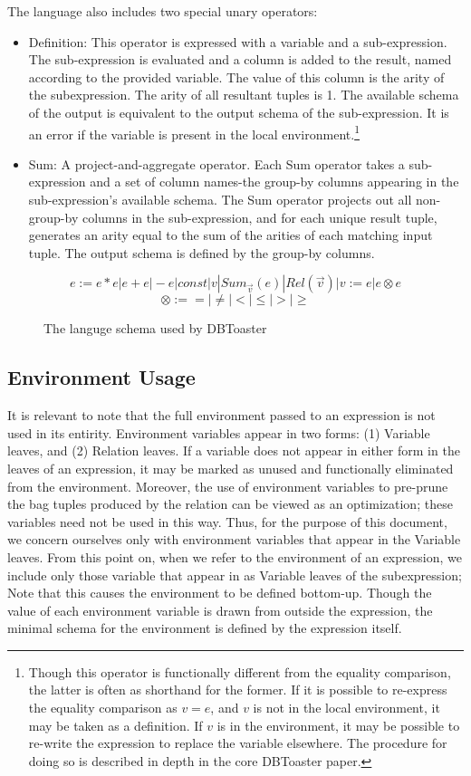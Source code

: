 \documentclass[11pt]{amsart}
\begin{document}
The language also includes two special unary operators:
\begin{itemize}
\item Definition: This operator is expressed with a variable and a sub-expression.  The sub-expression is evaluated and a column is added to the result, named according to the provided variable.  The value of this column is the arity of the subexpression.  The arity of all resultant tuples is 1.  The available schema of the output is equivalent to the output schema of the sub-expression.  It is an error if the variable is present in the local environment.\footnote{Though this operator is functionally different from the equality comparison, the latter is often as shorthand for the former.  If it is possible to re-express the equality comparison as $v = e$, and $v$ is not in the local environment, it may be taken as a definition.  If $v$ is in the environment, it may be possible to re-write the expression to replace the variable elsewhere.  The procedure for doing so is described in depth in the core DBToaster paper.}
\item Sum: A project-and-aggregate operator.  Each Sum operator takes a sub-expression and a set of column names-the group-by columns appearing in the sub-expression's available schema.  The Sum operator projects out all non-group-by columns in the sub-expression, and for each unique result tuple, generates an arity equal to the sum of the arities of each matching input tuple.  The output schema is defined by the group-by columns.  
\end{itemize}

\begin{figure}
$$ e := e * e | e + e | -e | const | v | Sum_{\vec v}(e) | Rel(\vec v) | v := e | e \otimes e$$
$$ \otimes := = | \neq | < | \leq | > | \geq$$
\caption{The languge schema used by DBToaster}
\end{figure}

\subsection{Environment Usage}
It is relevant to note that the full environment passed to an expression is not used in its entirity.  Environment variables appear in two forms: (1) Variable leaves, and (2) Relation leaves.  If a variable does not appear in either form in the leaves of an expression, it may be marked as unused and functionally eliminated from the environment.  Moreover, the use of environment variables to pre-prune the bag tuples produced by the relation can be viewed as an optimization; these variables need not be used in this way.  Thus, for the purpose of this document, we concern ourselves only with environment variables that appear in the Variable leaves.  From this point on, when we refer to the environment of an expression, we include only those variable that appear in as Variable leaves of the subexpression; Note that this causes the environment to be defined bottom-up.  Though the value of each environment variable is  drawn from outside the expression, the minimal schema for the environment is defined by the expression itself.
\end{document}
